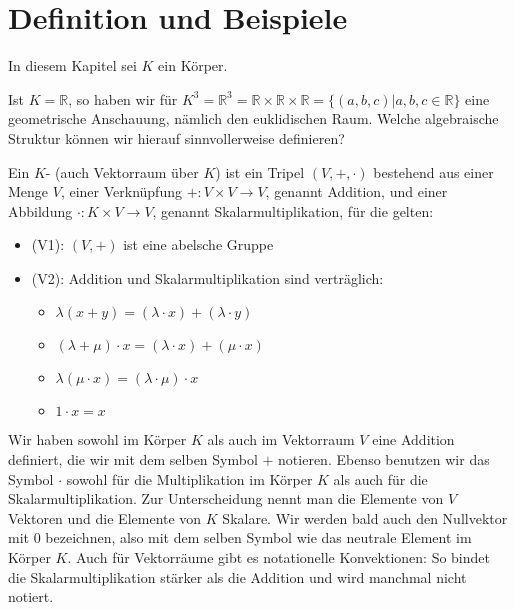 \section{Definition und Beispiele}

In diesem Kapitel sei $K$ ein Körper.

\begin{example}
	Ist $K=\mathbb R$, so haben wir für $K^3=\mathbb R^3=\mathbb R \times \mathbb R \times \mathbb R=
	\{(a,b,c) | a,b,c \in \mathbb R\}$ eine geometrische Anschauung, nämlich den euklidischen Raum. Welche algebraische 
	Struktur können wir hierauf sinnvollerweise definieren?
\end{example}

\begin{definition}[Vektorraum]
	Ein $K$- (auch Vektorraum über $K$) ist ein Tripel $(V,+,\cdot)$ 
	bestehend aus einer Menge $V$, einer Verknüpfung $+: V \times V \to V$, genannt Addition, und einer Abbildung 
	$\cdot: K \times V \to V$, genannt Skalarmultiplikation, für die gelten:
	\begin{itemize}
		\item (V1): $(V,+)$ ist eine abelsche Gruppe
		\item (V2): Addition und Skalarmultiplikation sind verträglich:
		\begin{itemize}
			\item $\lambda(x+y)=(\lambda\cdot x)+(\lambda\cdot y)$
			\item $(\lambda+\mu)\cdot x = (\lambda\cdot x)+(\mu\cdot x)$
			\item $\lambda(\mu\cdot x)=(\lambda\cdot\mu)\cdot x$
			\item $1\cdot x = x$
		\end{itemize}
	\end{itemize}
\end{definition}

\begin{remark}
	Wir haben sowohl im Körper $K$ als auch im Vektorraum $V$ eine Addition definiert, die wir mit 
	dem selben Symbol $+$ notieren. Ebenso benutzen wir das Symbol $\cdot$ sowohl für die Multiplikation im Körper $K$ 
	als auch für die Skalarmultiplikation. Zur Unterscheidung nennt man die Elemente von $V$ Vektoren und die Elemente 
	von $K$ Skalare. Wir werden bald auch den Nullvektor mit 0 bezeichnen, also mit dem selben Symbol wie das neutrale 
	Element im Körper $K$. Auch für Vektorräume gibt es notationelle Konvektionen: So bindet die Skalarmultiplikation 
	stärker als die Addition und wird manchmal nicht notiert.
\end{remark}

